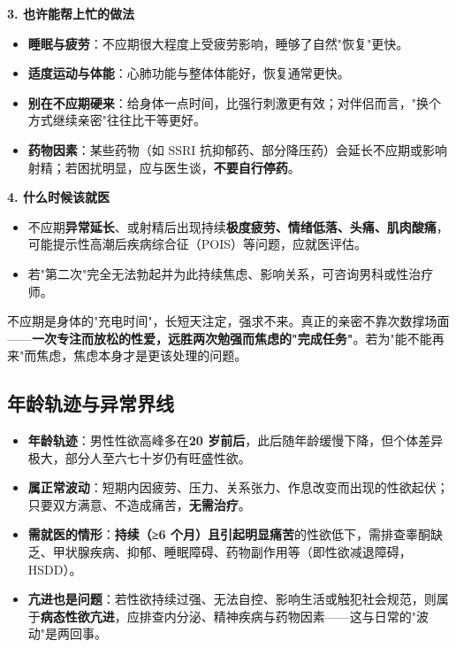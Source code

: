 \documentclass[12pt,a4paper,twoside]{ctexbook}
\begin{document}
\noindent\textbf{3. 也许能帮上忙的做法}

\begin{itemize}
	\item \textbf{睡眠与疲劳}：不应期很大程度上受疲劳影响，睡够了自然"恢复"更快。
	\item \textbf{适度运动与体能}：心肺功能与整体体能好，恢复通常更快。
	\item \textbf{别在不应期硬来}：给身体一点时间，比强行刺激更有效；对伴侣而言，"换个方式继续亲密"往往比干等更好。
	\item \textbf{药物因素}：某些药物（如 SSRI 抗抑郁药、部分降压药）会延长不应期或影响射精；若困扰明显，应与医生谈，\textbf{不要自行停药}。
\end{itemize}

\noindent\textbf{4. 什么时候该就医}

\begin{itemize}
	\item 不应期\textbf{异常延长}、或射精后出现持续\textbf{极度疲劳、情绪低落、头痛、肌肉酸痛}，可能提示性高潮后疾病综合征（POIS）等问题，应就医评估。
	\item 若"第二次"完全无法勃起并为此持续焦虑、影响关系，可咨询男科或性治疗师。
\end{itemize}

\begin{tcolorbox}[colback=pink!5!white,colframe=red!50!black,title=贴心小叮咛]
不应期是身体的"充电时间"，长短天注定，强求不来。真正的亲密不靠次数撑场面——\textbf{一次专注而放松的性爱，远胜两次勉强而焦虑的"完成任务"}。若为"能不能再来"而焦虑，焦虑本身才是更该处理的问题。
\end{tcolorbox}

\subsection{年龄轨迹与异常界线}

\begin{itemize}
	\item \textbf{年龄轨迹}：男性性欲高峰多在\textbf{20 岁前后}，此后随年龄缓慢下降，但个体差异极大，部分人至六七十岁仍有旺盛性欲。
	\item \textbf{属正常波动}：短期内因疲劳、压力、关系张力、作息改变而出现的性欲起伏；只要双方满意、不造成痛苦，\textbf{无需治疗}。
	\item \textbf{需就医的情形}：\textbf{持续（≥6 个月）且引起明显痛苦}的性欲低下，需排查睾酮缺乏、甲状腺疾病、抑郁、睡眠障碍、药物副作用等（即性欲减退障碍，HSDD）。
	\item \textbf{亢进也是问题}：若性欲持续过强、无法自控、影响生活或触犯社会规范，则属于\textbf{病态性欲亢进}，应排查内分泌、精神疾病与药物因素——这与日常的"波动"是两回事。
\end{itemize}
\end{document}

